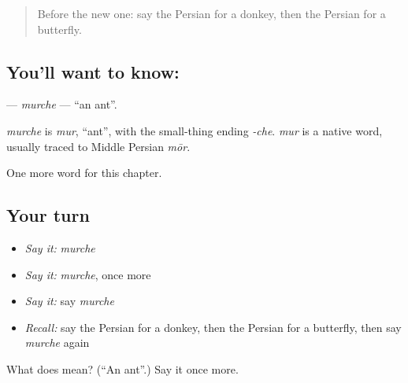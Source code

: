 \label{lesson:FA-C57-murche}



\begin{quote}
Before the new one: say the Persian for a donkey, then the Persian for a butterfly.
\end{quote}

\subsection*{You'll want to know: }
\textbf{} — \emph{murche} — \textquotedblleft{}an ant\textquotedblright{}.

\begin{cousinweb}
\emph{murche} is \emph{mur}, \textquotedblleft{}ant\textquotedblright{}, with the small-thing ending \emph{-che}. \emph{mur} is a native word, usually traced to Middle Persian \emph{mōr}.
\end{cousinweb}

\begin{grammarlens}[title={What you've built}]
One more word for this chapter.
\end{grammarlens}

\subsection*{Your turn}
\begin{itemize}
\raggedright
  \item \emph{Say it:} \emph{murche}
  \item \emph{Say it:} \emph{murche}, once more
  \item \emph{Say it:} say \emph{murche}
  \item \emph{Recall:} say the Persian for a donkey, then the Persian for a butterfly, then say \emph{murche} again
\end{itemize}

\begin{tcolorbox}[breakable,colback=teal!4,colframe=teal!35!black,title={Before you move on}]
What does  mean? (\textquotedblleft{}An ant\textquotedblright{}.) Say it once more.
\end{tcolorbox}
